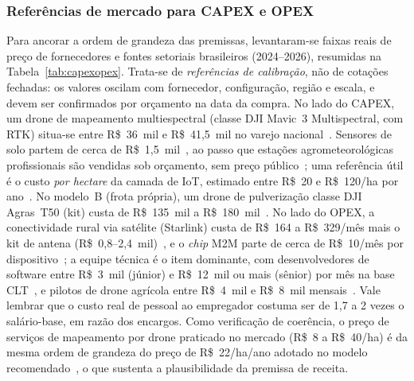 \documentclass[conference]{IEEEtran}
\newcommand{\rs}{R\$}
\begin{document}
\subsubsection{Referências de mercado para CAPEX e OPEX}
Para ancorar a ordem de grandeza das premissas, levantaram-se faixas reais de preço de fornecedores e fontes setoriais brasileiros (2024--2026), resumidas na Tabela~\ref{tab:capexopex}. Trata-se de \emph{referências de calibração}, não de cotações fechadas: os valores oscilam com fornecedor, configuração, região e escala, e devem ser confirmados por orçamento na data da compra. No lado do CAPEX, um drone de mapeamento multiespectral (classe DJI Mavic~3 Multispectral, com RTK) situa-se entre \rs~36~mil e \rs~41,5~mil no varejo nacional~\cite{drone_mavic3m}. Sensores de solo partem de cerca de \rs~1,5~mil~\cite{sensor_solo}, ao passo que estações agrometeorológicas profissionais são vendidas sob orçamento, sem preço público~\cite{estacao_agro}; uma referência útil é o custo \emph{por hectare} da camada de IoT, estimado entre \rs~20 e \rs~120/ha por ano~\cite{investidorrural_custos}. No modelo~B (frota própria), um drone de pulverização classe DJI Agras~T50 (kit) custa de \rs~135~mil a \rs~180~mil~\cite{drone_agras}. No lado do OPEX, a conectividade rural via satélite (Starlink) custa de \rs~164 a \rs~329/mês mais o kit de antena (\rs~0,8--2,4~mil)~\cite{starlink}, e o \textit{chip} M2M parte de cerca de \rs~10/mês por dispositivo~\cite{iotconect_m2m}; a equipe técnica é o item dominante, com desenvolvedores de software entre \rs~3~mil (júnior) e \rs~12~mil ou mais (sênior) por mês na base CLT~\cite{salario_dev}, e pilotos de drone agrícola entre \rs~4~mil e \rs~8~mil mensais~\cite{salario_piloto}. Vale lembrar que o custo real de pessoal ao empregador costuma ser de 1,7 a 2 vezes o salário-base, em razão dos encargos. Como verificação de coerência, o preço de serviços de mapeamento por drone praticado no mercado (\rs~8 a \rs~40/ha) é da mesma ordem de grandeza do preço de \rs~22/ha/ano adotado no modelo recomendado~\cite{investidorrural_custos}, o que sustenta a plausibilidade da premissa de receita.
\end{document}
